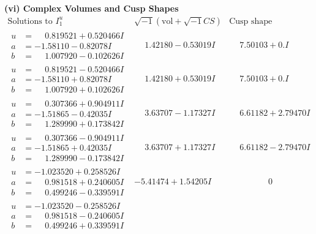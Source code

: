 \documentclass[1p]{elsarticle_modified}
\theoremstyle{definition}
\newcommand{\I}{\sqrt{-1}}
\begin{document}
\newpage\flushleft \textbf{(vi) Complex Volumes and Cusp Shapes}
$$\begin{array}{c|c|c}  
\text{Solutions to }I^u_{1}& \I (\text{vol} + \sqrt{-1}CS) & \text{Cusp shape}\\
 \hline 
\begin{aligned}
u &= \phantom{-}0.819521 + 0.520466 I \\
a &= -1.58110 - 0.82078 I \\
b &= \phantom{-}1.007920 - 0.102626 I\end{aligned}
 & \phantom{-}1.42180 - 0.53019 I & \phantom{-}7.50103 + 0. I\phantom{ +0.000000I} \\ \hline\begin{aligned}
u &= \phantom{-}0.819521 - 0.520466 I \\
a &= -1.58110 + 0.82078 I \\
b &= \phantom{-}1.007920 + 0.102626 I\end{aligned}
 & \phantom{-}1.42180 + 0.53019 I & \phantom{-}7.50103 + 0. I\phantom{ +0.000000I} \\ \hline\begin{aligned}
u &= \phantom{-}0.307366 + 0.904911 I \\
a &= -1.51865 - 0.42035 I \\
b &= \phantom{-}1.289990 + 0.173842 I\end{aligned}
 & \phantom{-}3.63707 - 1.17327 I & \phantom{-}6.61182 + 2.79470 I \\ \hline\begin{aligned}
u &= \phantom{-}0.307366 - 0.904911 I \\
a &= -1.51865 + 0.42035 I \\
b &= \phantom{-}1.289990 - 0.173842 I\end{aligned}
 & \phantom{-}3.63707 + 1.17327 I & \phantom{-}6.61182 - 2.79470 I \\ \hline\begin{aligned}
u &= -1.023520 + 0.258526 I \\
a &= \phantom{-}0.981518 + 0.240605 I \\
b &= \phantom{-}0.499246 - 0.339591 I\end{aligned}
 & -5.41474 + 1.54205 I & \phantom{-0.000000 } 0 \\ \hline\begin{aligned}
u &= -1.023520 - 0.258526 I \\
a &= \phantom{-}0.981518 - 0.240605 I \\
b &= \phantom{-}0.499246 + 0.339591 I\end{aligned}

\end{array}$$
\end{document}

